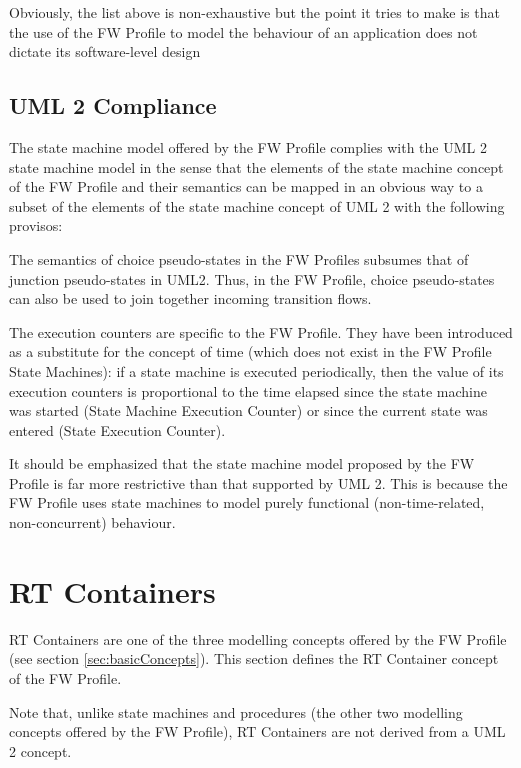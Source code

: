 \documentclass[a4paper,10pt]{article}
\let\stdsection\section
\renewcommand\section{\newpage\stdsection}
\newenvironment{fw_itemize}						%
{\begin{itemize}
  \setlength{\itemsep}{1mm}
  \setlength{\parskip}{0pt}
  \setlength{\parsep}{0pt}}
{\end{itemize}}
\begin{document}
Obviously, the list above is non-exhaustive but the point it tries to make is that the use of the
FW Profile to model the behaviour of an application does not dictate its software-level design

\subsection{UML 2 Compliance}
The state machine model offered by the FW Profile complies with the UML 2 state machine
model in the sense that the elements of the state machine concept of the FW Profile and their
semantics can be mapped in an obvious way to a subset of the elements of the state machine
concept of UML 2 with the following provisos:

\begin{fw_itemize}
\item The semantics of choice pseudo-states in the FW Profiles subsumes that of junction pseudo-states
in UML2. Thus, in the FW Profile, choice pseudo-states can also be used to join together incoming
transition flows.
\item The execution counters are specific to the FW Profile. They have been introduced as a
substitute for the concept of time (which does not exist in the FW Profile State Machines):
if a state machine is executed periodically, then the value of its execution 
counters is proportional to the time elapsed since the state machine was started (State Machine
Execution Counter) or since the current state was entered (State Execution Counter). 
\end{fw_itemize}

It should be emphasized that the state machine model proposed by the FW Profile is far more
restrictive than that supported by UML 2. This is because the FW Profile uses state machines
to model purely functional (non-time-related, non-concurrent) behaviour.

\newpage

\section{RT Containers}
RT Containers are one of the three modelling concepts offered by the FW Profile (see section
\ref{sec:basicConcepts}). This section defines the RT Container concept of the FW Profile.

Note that, unlike state machines and procedures (the other two modelling concepts offered by
the FW Profile), RT Containers are not derived from a UML 2 concept.
\end{document}
